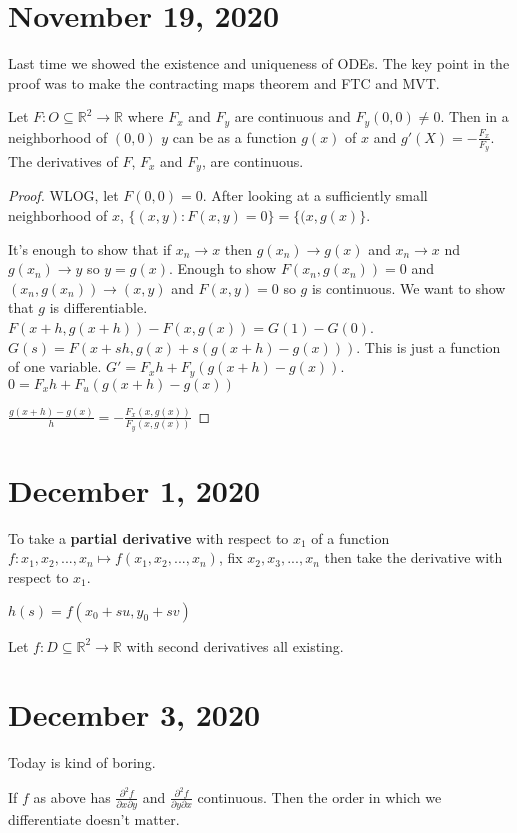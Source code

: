 \documentclass{article}
\newcommand{\vocab}[1]{\textbf{\color{blue!90}\boldmath #1}}
\newcommand{\R}{\mathbb{R}}
\newcommand{\ra}[1][]{\xrightarrow{#1}}
\begin{document}
\section{November 19, 2020}
Last time we showed the existence and uniqueness of ODEs. The key point in the proof was to make the contracting maps theorem and FTC and MVT.
\begin{theorem}
Let $F:O\subseteq \R^2\ra\R$ where $F_x$ and $F_y$ are continuous and $F_y(0,0)\neq 0$. Then in a neighborhood of $(0,0)$ $y$ can be as a function $g(x)$ of $x$ and $g'(X)=-\frac{F_x}{F_y}$. The derivatives of $F$, $F_x$ and $F_y$, are continuous.
\end{theorem}
\begin{proof}
WLOG, let $F(0,0)=0$. After looking at a sufficiently small neighborhood of $x$, $\{(x,y):F(x,y)=0\}=\{(x,g(x)\}$.

It's enough to show that if $x_n\ra x$ then $g(x_n)\ra g(x)$ and $x_n\ra x$ nd $g(x_n)\ra y$ so $y=g(x)$. Enough to show $F(x_n,g(x_n))=0$ and $(x_n,g(x_n))\ra(x,y)$ and $F(x,y)=0$ so $g$ is continuous. We want to show that $g$ is differentiable. $F(x+h,g(x+h))-F(x,g(x))=G(1)-G(0)$. $G(s)=F(x+sh,g(x)+s(g(x+h)-g(x)))$. This is just a function of one variable. $G'=F_xh+F_y(g(x+h)-g(x))$. $0=F_xh+F_u(g(x+h)-g(x))$

$\frac{g(x+h)-g(x)}{h}=-\frac{F_x(x,g(x))}{F_y(x,g(x))}$
\end{proof}
\section{December 1, 2020}
To take a \vocab{partial derivative} with respect to $x_1$ of a function $f:x_1,x_2,...,x_n\mapsto f(x_1,x_2,...,x_n)$, fix $x_2,x_3,...,x_n$ then take the derivative with respect to $x_1$.
\begin{definition}
$h(s)=f(x_0+su,y_0+sv)$
\end{definition}
Let $f:D\subseteq\R^2\ra\R$ with second derivatives all existing.
\section{December 3, 2020}
Today is kind of boring.
\begin{theorem}
If $f$ as above has $\frac{\partial^2 f}{\partial x\partial y}$ and $\frac{\partial^2 f}{\partial y\partial x}$ continuous. Then the order in which we differentiate doesn't matter.
\end{theorem}
\end{document}
